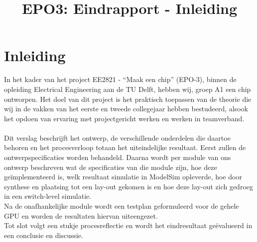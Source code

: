 \documentclass{scrartcl} %
\author{}
\title{EPO3: Eindrapport - Inleiding}
\begin{document}
\chapter{Inleiding}
\label{ch:inleiding}

In het kader van het project EE2821 - ``Maak een chip'' (EPO-3), binnen de opleiding Electrical Engineering aan de TU Delft, hebben wij, groep A1 een chip ontworpen. Het doel van dit project is het praktisch toepassen van de theorie die wij in de vakken van het eerste en tweede collegejaar hebben bestudeerd, alsook het opdoen van ervaring met projectgericht werken en werken in teamverband.
\\\\
Dit verslag beschrijft het ontwerp, de verschillende onderdelen die daartoe behoren en het procesverloop totaan het uiteindelijke resultaat. Eerst zullen de ontwerpspecificaties worden behandeld. Daarna wordt per module van ons ontwerp beschreven wat de specificaties van die module zijn, hoe deze geïmplementeerd is, welk resultaat simulatie in ModelSim opleverde, hoe door synthese en plaatsing tot een lay-out gekomen is en hoe deze lay-out zich gedroeg in een switch-level simulatie.
\\
Na de onafhankelijke module wordt een testplan geformuleerd voor de gehele GPU en worden de resultaten hiervan uiteengezet.
\\
Tot slot volgt een stukje procesreflectie en wordt het eindresultaat geëvalueerd in een conclusie en discussie.
\end{document}
